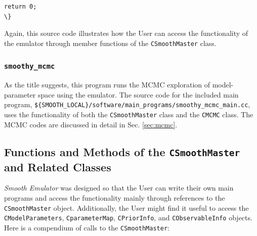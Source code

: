 \documentclass[UserManual.tex]{subfiles}
\begin{document}
\begin{sloppypar}
{\begin{Verbatim}[commandchars=\\\{\}]
   return 0;
\}
\end{Verbatim}
}\vspace*{-8pt}
Again, this source code illustrates how the User can access the functionality of the emulator through member functions of the {\tt CSmoothMaster} class.

\subsubsection{{\tt smoothy\_mcmc}}
As the title suggests, this program runs the MCMC exploration of model-parameter space using the emulator. The source code for the included main program, {\tt \$\{SMOOTH\_LOCAL\}/software/main\_programs/smoothy\_mcmc\_main.cc}, uses the functionality of both the {\tt CSmoothMaster} class and the {\tt CMCMC} class. The MCMC codes are discussed in detail in Sec. \ref{sec:mcmc}.

\subsection{Functions and Methods of the {\tt CSmoothMaster} and Related Classes}
{\it Smooth Emulator} was designed so that the User can write their own main programs and access the functionality mainly through references to the {\tt CSmoothMaster} object. Additionally, the User might find it useful to access the {\tt CModelParameters}, {\tt CparameterMap}, {\tt CPriorInfo}, and {\tt CObservableInfo} objects. Here is a compendium of calls to the {\tt CSmoothMaster}:


\end{sloppypar}
\end{document}

